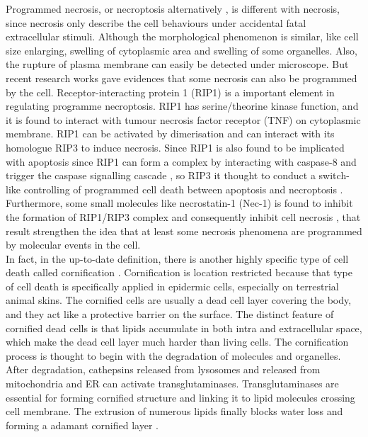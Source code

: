 Programmed necrosis, or necroptosis alternatively \citep{kroemer2009classification}, is different with necrosis, since necrosis only describe the cell behaviours under accidental fatal extracellular stimuli. Although the morphological phenomenon is similar, like cell size enlarging, swelling of cytoplasmic area and swelling of some organelles. Also, the rupture of plasma membrane can easily be detected under microscope. But recent research works gave evidences that some necrosis can also be programmed by the cell. Receptor-interacting protein 1 (RIP1) is a important element in regulating programme necroptosis. RIP1 has serine/theorine kinase function, and it is found to interact with tumour necrosis factor  receptor (TNF) on cytoplasmic membrane. RIP1 can be activated by dimerisation and can interact with its homologue RIP3 to induce necrosis. Since RIP1 is also found to be implicated with apoptosis since RIP1 can form a complex by interacting with caspase-8 and trigger the caspase signalling cascade \citep{feoktistova2011ciaps}, so RIP3 it thought to conduct a switch-like controlling of programmed cell death between apoptosis and necroptosis \citep{zhang2009rip3}. Furthermore, some small molecules like necrostatin-1 (Nec-1) is found to inhibit the formation of RIP1/RIP3 complex and consequently inhibit cell necrosis \citep{degterev2013activity}, that result strengthen the idea that at least some necrosis phenomena are programmed by molecular events in the cell.\\
In fact, in the up-to-date definition, there is another highly specific type of cell death called cornification \citep{kroemer2009classification}. Cornification is location restricted because that type of cell death is specifically applied in epidermic cells, especially on terrestrial animal skins. The cornified cells are usually a dead cell layer covering the body, and they act like a protective barrier on the surface. The distinct feature of cornified dead cells is that lipids accumulate in both intra and extracellular space, which make the dead cell layer much harder than living cells. The cornification process is thought to begin with the degradation of molecules and organelles. After degradation, cathepsins released from lysosomes and  released from mitochondria and ER can activate transglutaminases. Transglutaminases are essential for forming cornified structure and linking it to lipid molecules crossing cell membrane. The extrusion of numerous lipids finally blocks water loss and forming a adamant cornified layer \citep{candi2005cornified}.\\
